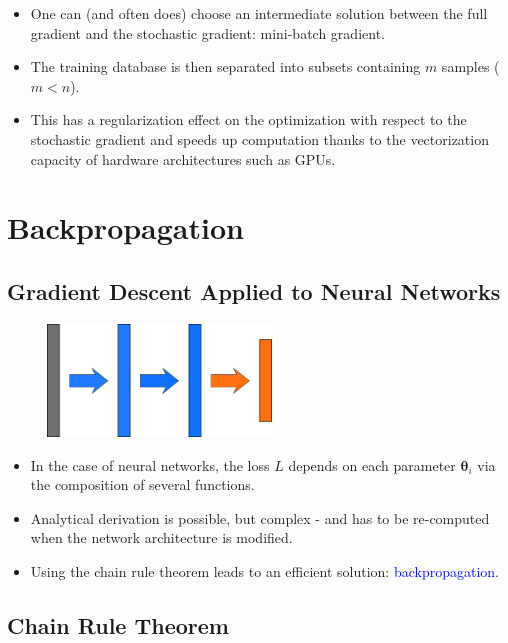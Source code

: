 \documentclass{book}
\newcommand{\loss}{L}
\newcommand{\param}{\boldsymbol{\theta}}
\begin{document}
\begin{itemize}
\item One can (and often does) choose an intermediate solution between the full gradient and the stochastic gradient: mini-batch gradient.
\item The training database is then separated into subsets containing $m$ samples ($m < n$).
\item This has a regularization effect on the optimization with respect to the stochastic gradient and speeds up computation thanks to the vectorization capacity of hardware architectures such as GPUs.
\end{itemize}

\section{Backpropagation}

\subsection{Gradient Descent Applied to Neural Networks}

\begin{figure}[h]
    \centering
    \includegraphics[height=3cm]{nn_representation3}
\end{figure}

\begin{itemize}
\item In the case of neural networks, the loss $\loss$ depends on each parameter $\param_i$ via the composition of several functions.
\item Analytical derivation is possible, but complex - and has to be re-computed when the network architecture is modified.
\item Using the chain rule theorem leads to an efficient solution: \textcolor{blue}{backpropagation}.
\end{itemize}

\subsection{Chain Rule Theorem}
\end{document}
